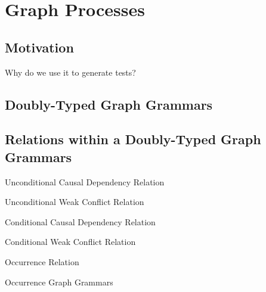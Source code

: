 \chapter{Graph Processes}

\section{Motivation}

Why do we use it to generate tests?

\section{Doubly-Typed Graph Grammars}

\begin{definition}
\end{definition}

\begin{definition}
\end{definition}

\begin{definition}
\end{definition}

\begin{definition}
\end{definition}

\section{Relations within a Doubly-Typed Graph Grammars}

\begin{definition}{Unconditional Causal Dependency Relation}
\end{definition}

\begin{definition}{Unconditional Weak Conflict Relation}
\end{definition}

\begin{definition}{Conditional Causal Dependency Relation}
\end{definition}

\begin{definition}{Conditional Weak Conflict Relation}
\end{definition}

\begin{definition}{Occurrence Relation}
\end{definition}

\begin{definition}{Occurrence Graph Grammars}
\end{definition}
